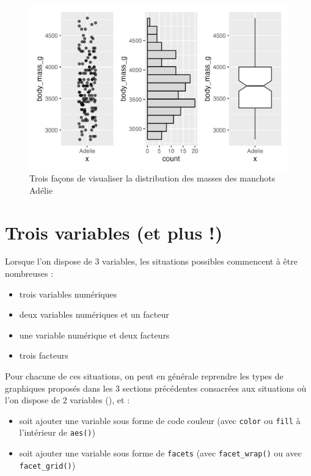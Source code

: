 \documentclass[
  letterpaper,
  DIV=11,
  numbers=noendperiod]{scrreprt}
\providecommand{\tightlist}{%
  \setlength{\itemsep}{0pt}\setlength{\parskip}{0pt}}\usepackage{longtable,booktabs,array}
\begin{document}
\begin{figure}

{\centering \includegraphics{./03-visualization_files/figure-pdf/fig-comboxplot-1.png}

}

\caption{\label{fig-comboxplot}Trois façons de visualiser la
distribution des masses des manchots Adélie}

\end{figure}

\hypertarget{trois-variables-et-plus}{%
\section{Trois variables (et plus !)}\label{trois-variables-et-plus}}

Lorsque l'on dispose de 3 variables, les situations possibles commencent
à être nombreuses :

\begin{itemize}
\tightlist
\item
  trois variables numériques
\item
  deux variables numériques et un facteur
\item
  une variable numérique et deux facteurs
\item
  trois facteurs
\end{itemize}

Pour chacune de ces situations, on peut en générale reprendre les types
de graphiques proposés dans les 3 sections précédentes consacrées aux
situations où l'on dispose de 2 variables (), et :

\begin{itemize}
\tightlist
\item
  soit ajouter une variable sous forme de code couleur (avec
  \texttt{color} ou \texttt{fill} à l'intérieur de \texttt{aes()})
\item
  soit ajouter une variable sous forme de \texttt{facets} (avec
  \texttt{facet\_wrap()} ou avec \texttt{facet\_grid()})
\end{itemize}
\end{document}
